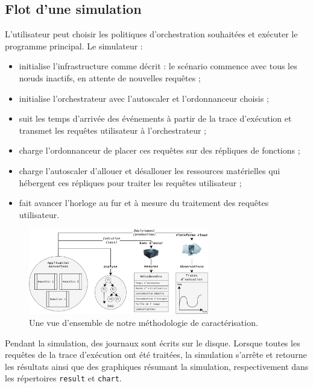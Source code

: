 \subsection{Flot d'une simulation}

L'utilisateur peut choisir les politiques d'orchestration souhaitées et exécuter le programme principal. Le simulateur :

\begin{itemize}
    \item initialise l'infrastructure comme décrit : le scénario commence avec tous les nœuds inactifs, en attente de nouvelles requêtes ;
    \item initialise l'orchestrateur avec l'autoscaler et l'ordonnanceur choisis ;
    \item suit les temps d'arrivée des événements à partir de la trace d'exécution et transmet les requêtes utilisateur à l'orchestrateur ;
    \item charge l'ordonnanceur de placer ces requêtes sur des répliques de fonctions ;
    \item charge l'autoscaler d'allouer et désallouer les ressources matérielles qui hébergent ces répliques pour traiter les requêtes utilisateur ;
    \item fait avancer l'horloge au fur et à mesure du traitement des requêtes utilisateur.
\end{itemize}

\begin{figure}[!ht]
    \centering
    \includegraphics[width=0.7\textwidth]{6_Chapitre6/figures/characterization.png}
    \caption{Une vue d'ensemble de notre méthodologie de caractérisation.}
\label{figure:herosim-characterization}
\end{figure}

Pendant la simulation, des journaux sont écrits sur le disque. Lorsque toutes les requêtes de la trace d'exécution ont été traitées, la simulation s'arrête et retourne les résultats ainsi que des graphiques résumant la simulation, respectivement dans les répertoires \texttt{result} et \texttt{chart}.


